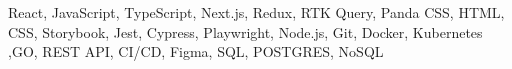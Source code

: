 \noindent React, JavaScript, TypeScript, Next.js, Redux, RTK Query, Panda CSS, HTML, CSS, Storybook, Jest, Cypress, Playwright, Node.js, Git, Docker, Kubernetes ,GO, REST API, CI/CD, Figma, SQL, POSTGRES, NoSQL
